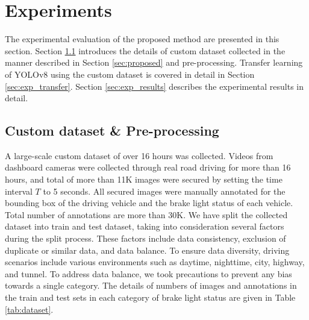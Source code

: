 \section{Experiments}
\label{sec:experiments}

The experimental evaluation of the proposed method are presented in this section. 
Section \ref{sec:exp_pre} introduces the details of custom dataset collected in the manner described in Section \ref{sec:proposed} and pre-processing.
Transfer learning of YOLOv8 using the custom dataset is covered in detail in Section \ref{sec:exp_transfer}.
Section \ref{sec:exp_results} describes the experimental results in detail.

\subsection{Custom dataset \& Pre-processing}
\label{sec:exp_pre}
A large-scale custom dataset of over 16 hours was collected. 
Videos from dashboard cameras were collected through real road driving for more than 16 hours, and total of more than 11K images were secured by setting the time interval $T$ to 5 seconds.
All secured images were manually annotated for the bounding box of the driving vehicle and the brake light status of each vehicle.
Total number of annotations are more than 30K.
We have split the collected dataset into train and test dataset, taking into consideration several factors during the split process.
These factors include data consistency, exclusion of duplicate or similar data, and data balance.
To ensure data diversity, driving scenarios include various environments such as daytime, nighttime, city, highway, and tunnel.
To address data balance, we took precautions to prevent any bias towards a single category.
The details of numbers of images and annotations in the train and test sets in each category of brake light status are given in Table \ref{tab:dataset}.




